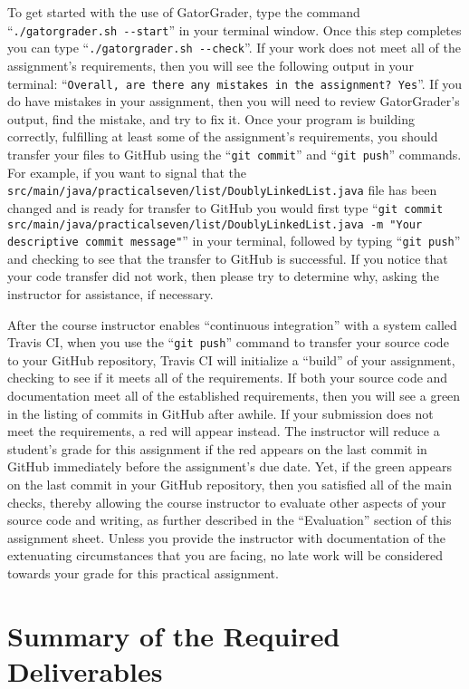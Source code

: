 \documentclass[11pt]{article}
\newcommand{\mainprogramsource}{\lstinline{src/main/java/practicalseven/list/DoublyLinkedList.java}}
\newcommand{\gatorgraderstart}{\command{./gatorgrader.sh --start}}
\newcommand{\gatorgradercheck}{\command{./gatorgrader.sh --check}}
\newcommand{\gitcommit}{\command{git commit}}
\newcommand{\gitpush}{\command{git push}}
\newcommand{\gitcommitmainprogram}{\command{git commit src/main/java/practicalseven/list/DoublyLinkedList.java -m "Your
descriptive commit message"}}
\newcommand{\command}[1]{``\lstinline{#1}''}
\newcommand{\step}[1]{``{#1}''}
\newcommand{\checkmark}{\ding{51}}
\newcommand{\naughtmark}{\ding{55}}
\begin{document}
To get started with the use of GatorGrader, type the command
\gatorgraderstart{} in your terminal window. Once this step completes you can
type \gatorgradercheck{}. If your work does not meet all of the assignment's
requirements, then you will see the following output in your terminal:
\command{Overall, are there any mistakes in the assignment? Yes}. If you do
have mistakes in your assignment, then you will need to review GatorGrader's
output, find the mistake, and try to fix it. Once your program is building
correctly, fulfilling at least some of the assignment's requirements, you
should transfer your files to GitHub using the \gitcommit{} and \gitpush{}
commands. For example, if you want to signal that the \mainprogramsource{} file
has been changed and is ready for transfer to GitHub you would first type
\gitcommitmainprogram{} in your terminal, followed by typing \gitpush{} and
checking to see that the transfer to GitHub is successful. If you notice that
your code transfer did not work, then please try to determine why, asking the
instructor for assistance, if necessary.

After the course instructor enables \step{continuous integration} with a system
called Travis CI, when you use the \gitpush{} command to transfer your source
code to your GitHub repository, Travis CI will initialize a \step{build} of your
assignment, checking to see if it meets all of the requirements. If both your
source code and documentation meet all of the established requirements, then you
will see a green \checkmark{} in the listing of commits in GitHub after awhile.
If your submission does not meet the requirements, a red \naughtmark{} will
appear instead. The instructor will reduce a student's grade for this assignment
if the red \naughtmark{} appears on the last commit in GitHub immediately before
the assignment's due date. Yet, if the green \checkmark{} appears on the last
commit in your GitHub repository, then you satisfied all of the main checks,
thereby allowing the course instructor to evaluate other aspects of your source
code and writing, as further described in the \step{Evaluation} section of this
assignment sheet. Unless you provide the instructor with documentation of the
extenuating circumstances that you are facing, no late work will be considered
towards your grade for this practical assignment.

\section*{Summary of the Required Deliverables}
\end{document}
